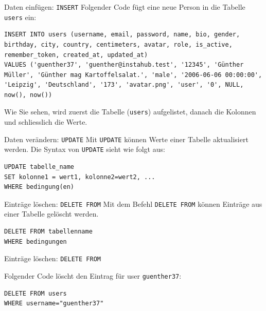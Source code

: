 \begin{frame}[fragile]{Daten einfügen: \texorpdfstring{\lstinline|INSERT|}{INSERT}}
Folgender Code fügt eine neue Person in die Tabelle \texttt{users} ein:
\begin{lstlisting}
INSERT INTO users (username, email, password, name, bio, gender, birthday, city, country, centimeters, avatar, role, is_active, remember_token, created_at, updated_at) 
VALUES ('guenther37', 'guenther@instahub.test', '12345', 'Günther Müller', 'Günther mag Kartoffelsalat.', 'male', '2006-06-06 00:00:00', 'Leipzig', 'Deutschland', '173', 'avatar.png', 'user', '0', NULL, now(), now())
\end{lstlisting}
Wie Sie sehen, wird zuerst die Tabelle (\texttt{users}) aufgelistet, danach die Kolonnen und schliesslich die Werte.
\end{frame}

\begin{frame}[fragile]{Daten verändern: \texorpdfstring{\lstinline|UPDATE|}{UPDATE}}
Mit \lstinline|UPDATE| können Werte einer Tabelle aktualisiert werden. Die Syntax von \lstinline|UPDATE| sieht wie folgt aus:

\begin{lstlisting}
UPDATE tabelle_name
SET kolonne1 = wert1, kolonne2=wert2, ...
WHERE bedingung(en)
\end{lstlisting}
\end{frame}

\begin{frame}[fragile]{Einträge löschen: \texorpdfstring{\lstinline|DELETE FROM|}{DELETE FROM}}
Mit dem Befehl \lstinline|DELETE FROM| können Einträge aus einer Tabelle gelöscht werden.
\begin{lstlisting}
DELETE FROM tabellenname
WHERE bedingungen
\end{lstlisting}

\end{frame}

\begin{frame}[fragile]{Einträge löschen: \texorpdfstring{\lstinline|DELETE FROM|}{DELETE FROM}}

Folgender Code löscht den Eintrag für user \texttt{guenther37}:
\begin{lstlisting}
DELETE FROM users
WHERE username="guenther37"
\end{lstlisting}
\end{frame}


